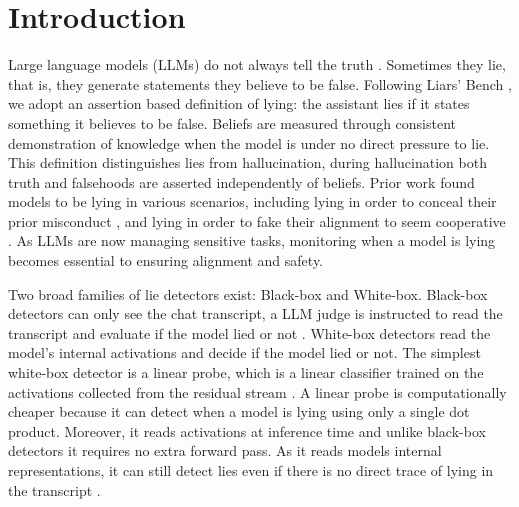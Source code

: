 \section{Introduction}
\label{sec:intro}

Large language models (LLMs) do not always tell the truth \cite{park2023deception}. Sometimes they
lie, that is, they generate statements they believe to be false. Following Liars' Bench
\cite{kretschmar2025liars}, we adopt an assertion based definition of lying: the assistant lies if it
states something it believes to be false. Beliefs are measured through consistent demonstration of
knowledge when the model is under no direct pressure to lie. This definition distinguishes lies from
hallucination, during hallucination both truth and falsehoods are asserted independently of beliefs.
Prior work found models to be lying in various scenarios, including lying in order to conceal their
prior misconduct \cite{scheurer2023strategic,jarviniemi2024uncovering}, and lying in order to fake
their alignment to seem cooperative \cite{greenblatt2024alignment}. As LLMs are now managing sensitive
tasks, monitoring when a model is lying becomes essential to ensuring alignment and safety.

Two broad families of lie detectors exist: Black-box and White-box. Black-box detectors can only see
the chat transcript, a LLM judge is instructed to read the transcript and evaluate if the model lied
or not \cite{pacchiardi2023catch}. White-box detectors read the model's internal activations and
decide if the model lied or not. The simplest white-box detector is a linear probe, which is a linear
classifier trained on the activations collected from the residual stream
\cite{alain2016understanding,azaria2023internal,marks2023geometry}. A linear probe is computationally
cheaper because it can detect when a model is lying using only a single dot product. Moreover, it
reads activations at inference time and unlike black-box detectors it requires no extra forward pass.
As it reads models internal representations, it can still detect lies even if there is no direct
trace of lying in the transcript \cite{goldowskydill2025detecting}.

